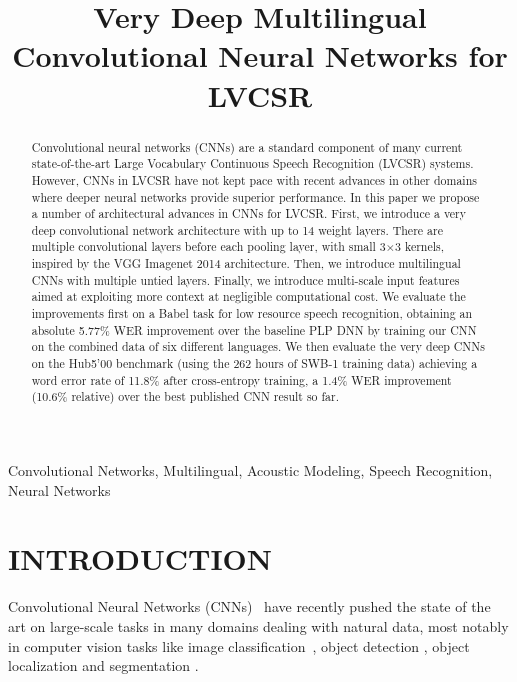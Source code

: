 \documentclass{article}
\title{Very Deep Multilingual Convolutional Neural Networks for LVCSR}
\begin{document}
\ninept
\maketitle
\begin{abstract}
Convolutional neural networks (CNNs) are a standard component of many current state-of-the-art
Large Vocabulary Continuous Speech Recognition (LVCSR) systems.
However, CNNs in LVCSR have not kept pace with recent advances in other domains where
deeper neural networks provide superior performance.
In this paper we propose a number of architectural advances in CNNs for LVCSR.
First, we introduce a very deep convolutional network architecture with up to 14 weight layers.
There are multiple convolutional layers before each pooling layer, 
with small 3$\times$3 kernels, inspired by the VGG Imagenet 2014 architecture.
Then, we introduce multilingual CNNs with multiple untied layers.
Finally, we introduce multi-scale input features aimed at exploiting more context at negligible computational cost.
We evaluate the improvements first on a Babel task for low resource speech recognition, obtaining an absolute
5.77\% WER improvement over the baseline PLP DNN by training our CNN on the combined data of six different languages.
We then evaluate the very deep CNNs on the Hub5'00 benchmark (using the 262 hours of SWB-1 training data) achieving
a word error rate of 11.8\% after cross-entropy training, 
a 1.4\% WER improvement (10.6\% relative) over the best published CNN result so far.
\end{abstract}
\begin{keywords}
Convolutional Networks, Multilingual, Acoustic Modeling, Speech Recognition, Neural Networks
\end{keywords}
\section{INTRODUCTION}
\label{sec:intro}

Convolutional Neural Networks (CNNs)~\cite{lecun1998gradient} have recently pushed the state of the art
on large-scale tasks in many domains dealing with natural data,
most notably in computer vision tasks like image classification~\cite{krizhevsky2012imagenet, simonyan2014very},
object detection \cite{sermanet2013pedestrian,girshick2014rich}, object localization \cite{sermanet2013overfeat}
and segmentation \cite{farabet2013learning}.
\end{document}
